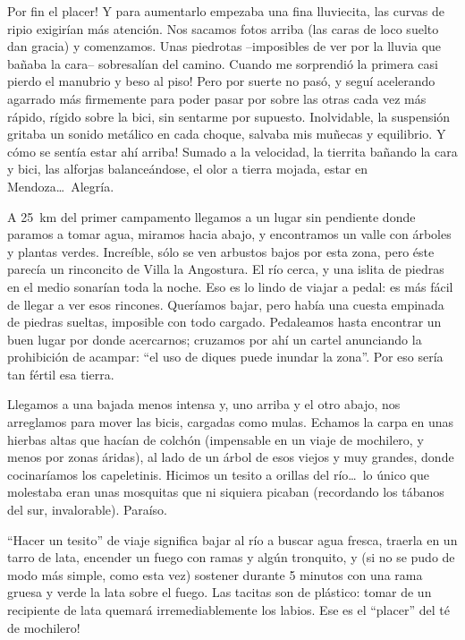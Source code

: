 \textexclamdown Por fin el placer! Y para aumentarlo empezaba una fina
lluviecita, las curvas de ripio exigir\'ian m\'as atenci\'on. Nos sacamos fotos
arriba (las caras de loco suelto dan gracia) y comenzamos. Unas piedrotas
--imposibles de ver por la lluvia que ba\~naba la cara-- sobresal\'ian del
camino. \textexclamdown Cuando me sorprendi\'o la primera casi pierdo el
manubrio y beso al piso! Pero por suerte no pas\'o, y segu\'i acelerando
agarrado m\'as firmemente para poder pasar por sobre las otras cada vez m\'as
r\'apido, r\'igido sobre la bici, sin sentarme por supuesto. Inolvidable, la
suspensi\'on gritaba un sonido met\'alico en cada choque, salvaba mis mu\~necas
y equilibrio. \textexclamdown Y c\'omo se sent\'ia estar ah\'i arriba! Sumado a
la velocidad, la tierrita ba\~nando la cara y bici, las alforjas
balance\'andose, el olor a tierra mojada, estar en Mendoza\ldots\ Alegr\'ia.

A 25~km del primer campamento llegamos a un lugar sin pendiente donde paramos a
tomar agua, miramos hacia abajo, y encontramos un valle con \'arboles y plantas
verdes. Incre\'ible, s\'olo se ven arbustos bajos por esta zona, pero \'este
parec\'ia un rinconcito de Villa la Angostura. El r\'io cerca, y una islita de
piedras en el medio sonar\'ian toda la noche. Eso es lo lindo de viajar a pedal:
es m\'as f\'acil de llegar a ver esos rincones. Quer\'iamos bajar, pero hab\'ia
una cuesta empinada de piedras sueltas, imposible con todo cargado. Pedaleamos
hasta encontrar un buen lugar por donde acercarnos; cruzamos por ah\'i un cartel
anunciando la prohibici\'on de acampar: ``el uso de diques puede inundar la
zona''. Por eso ser\'ia tan f\'ertil esa tierra.

Llegamos a una bajada menos intensa y, uno arriba y el otro abajo, nos
arreglamos para mover las bicis, cargadas como mulas. Echamos la carpa en unas
hierbas altas que hac\'ian de colch\'on (impensable en un viaje de mochilero, y
menos por zonas \'aridas), al lado de un \'arbol de esos viejos y muy grandes,
donde cocinar\'iamos los capeletinis. Hicimos un tesito a orillas del
r\'io\ldots\ lo \'unico que molestaba eran unas mosquitas que ni siquiera
picaban (recordando los t\'abanos del sur, invalorable). Para\'iso.

``Hacer un tesito'' de viaje significa bajar al r\'io a buscar agua fresca,
traerla en un tarro de lata, encender un fuego con ramas y alg\'un tronquito, y
(si no se pudo de modo m\'as simple, como esta vez) sostener durante 5 minutos
con una rama gruesa y verde la lata sobre el fuego. Las tacitas son de
pl\'astico: tomar de un recipiente de lata quemar\'a irremediablemente los
labios. \textexclamdown Ese es el ``placer'' del t\'e de mochilero!

